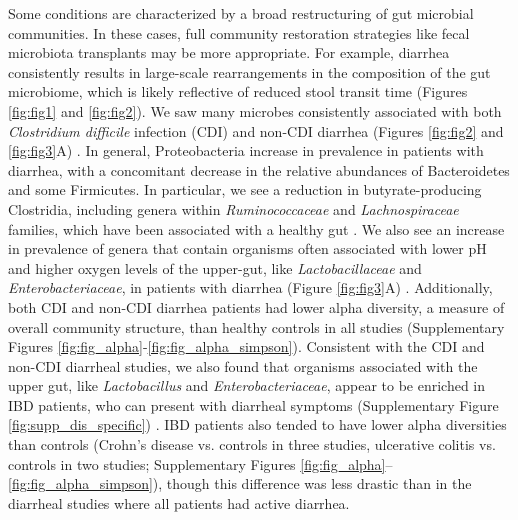 Some conditions are characterized by a broad restructuring of gut microbial communities.
In these cases, full community restoration strategies like fecal microbiota transplants may be more appropriate.
For example, diarrhea consistently results in large-scale rearrangements in the composition of the gut microbiome, which is likely reflective of reduced stool transit time (Figures \ref{fig:fig1} and \ref{fig:fig2}).
We saw many microbes consistently associated with both \textit{Clostridium difficile} infection (CDI) and non-CDI diarrhea (Figures \ref{fig:fig2} and \ref{fig:fig3}A) \cite{cdi-youngster,cdi-schubert,cdi-vincent,edd-singh}.
In general, Proteobacteria increase in prevalence in patients with diarrhea, with a concomitant decrease in the relative abundances of Bacteroidetes and some Firmicutes.
In particular, we see a reduction in butyrate-producing Clostridia, including genera within \textit{Ruminococcaceae} and \textit{Lachnospiraceae} families, which have been associated with a healthy gut \cite{wong2006colonic}.
We also see an increase in prevalence of genera that contain organisms often associated with lower pH and higher oxygen levels of the upper-gut, like \textit{Lactobacillaceae} and \textit{Enterobacteriaceae}, in patients with diarrhea (Figure \ref{fig:fig3}A) \cite{donaldson2016gut}.
Additionally, both CDI and non-CDI diarrhea patients had lower alpha diversity, a measure of overall community structure, than healthy controls in all studies (Supplementary Figures \ref{fig:fig_alpha}-\ref{fig:fig_alpha_simpson}).
Consistent with the CDI and non-CDI diarrheal studies, we also found that organisms associated with the upper gut, like \textit{Lactobacillus} and \textit{Enterobacteriaceae}, appear to be enriched in IBD patients, who can present with diarrheal symptoms (Supplementary Figure \ref{fig:supp_dis_specific}) \cite{donaldson2016gut,Kirsner1982ibd}.
IBD patients also tended to have lower alpha diversities than controls (Crohn's disease vs. controls in three studies, ulcerative colitis vs. controls in two studies; Supplementary Figures \ref{fig:fig_alpha}--\ref{fig:fig_alpha_simpson}), though this difference was less drastic than in the diarrheal studies where all patients had active diarrhea.

